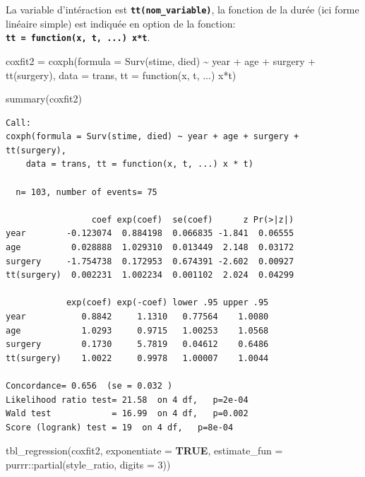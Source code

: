 \documentclass[
  12pt,
  letterpaper,
  DIV=11,
  numbers=noendperiod,
  onepage,
  openany]{scrreprt}
\newenvironment{Shaded}{\begin{snugshade}}{\end{snugshade}}
\newcommand{\AttributeTok}[1]{\textcolor[rgb]{0.80,0.80,0.80}{#1}}
\newcommand{\ConstantTok}[1]{\textcolor[rgb]{0.86,0.64,0.64}{\textbf{#1}}}
\newcommand{\ControlFlowTok}[1]{\textcolor[rgb]{0.94,0.87,0.69}{#1}}
\newcommand{\DecValTok}[1]{\textcolor[rgb]{0.86,0.86,0.80}{#1}}
\newcommand{\FunctionTok}[1]{\textcolor[rgb]{0.94,0.94,0.56}{#1}}
\newcommand{\NormalTok}[1]{\textcolor[rgb]{0.80,0.80,0.80}{#1}}
\newcommand{\OtherTok}[1]{\textcolor[rgb]{0.94,0.94,0.56}{#1}}
\newcommand{\SpecialCharTok}[1]{\textcolor[rgb]{0.86,0.64,0.64}{#1}}
\begin{document}
La variable d'intéraction est \textbf{\texttt{tt(nom\_variable)}}, la
fonction de la durée (ici forme linéaire simple) est indiquée en option
de la fonction: \textbf{\texttt{tt\ =\ function(x,\ t,\ ...)\ x*t}}.

\begin{Shaded}
\begin{Highlighting}[]
\NormalTok{coxfit2 }\OtherTok{=} \FunctionTok{coxph}\NormalTok{(}\AttributeTok{formula =} \FunctionTok{Surv}\NormalTok{(stime, died) }\SpecialCharTok{\textasciitilde{}}\NormalTok{ year }\SpecialCharTok{+}\NormalTok{ age }\SpecialCharTok{+}\NormalTok{ surgery }\SpecialCharTok{+} \FunctionTok{tt}\NormalTok{(surgery), }\AttributeTok{data =}\NormalTok{ trans, }\AttributeTok{tt =} \ControlFlowTok{function}\NormalTok{(x, t, ...) x}\SpecialCharTok{*}\NormalTok{t)}

\FunctionTok{summary}\NormalTok{(coxfit2)}
\end{Highlighting}
\end{Shaded}

\begin{verbatim}
Call:
coxph(formula = Surv(stime, died) ~ year + age + surgery + tt(surgery), 
    data = trans, tt = function(x, t, ...) x * t)

  n= 103, number of events= 75 

                 coef exp(coef)  se(coef)      z Pr(>|z|)
year        -0.123074  0.884198  0.066835 -1.841  0.06555
age          0.028888  1.029310  0.013449  2.148  0.03172
surgery     -1.754738  0.172953  0.674391 -2.602  0.00927
tt(surgery)  0.002231  1.002234  0.001102  2.024  0.04299

            exp(coef) exp(-coef) lower .95 upper .95
year           0.8842     1.1310   0.77564    1.0080
age            1.0293     0.9715   1.00253    1.0568
surgery        0.1730     5.7819   0.04612    0.6486
tt(surgery)    1.0022     0.9978   1.00007    1.0044

Concordance= 0.656  (se = 0.032 )
Likelihood ratio test= 21.58  on 4 df,   p=2e-04
Wald test            = 16.99  on 4 df,   p=0.002
Score (logrank) test = 19  on 4 df,   p=8e-04
\end{verbatim}

\begin{Shaded}
\begin{Highlighting}[]
\FunctionTok{tbl\_regression}\NormalTok{(coxfit2, }\AttributeTok{exponentiate =} \ConstantTok{TRUE}\NormalTok{, }\AttributeTok{estimate\_fun =}\NormalTok{ purrr}\SpecialCharTok{::}\FunctionTok{partial}\NormalTok{(style\_ratio, }\AttributeTok{digits =} \DecValTok{3}\NormalTok{))}
\end{Highlighting}
\end{Shaded}
\end{document}
